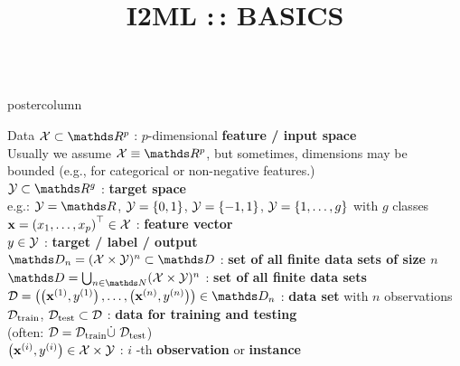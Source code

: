\documentclass{beamer}
\title{I2ML :\,: BASICS} %
\newlength{\columnheight} %
\begin{document}
\begin{frame}[fragile]{}
\vspace{-8ex}
\begin{columns}
	\begin{column}{.31\textwidth}
		\begin{beamercolorbox}[center]{postercolumn}
			\begin{minipage}{.98\textwidth}
				\parbox[t][\columnheight]{\textwidth}{
\begin{myblock}{Data}
 $\Xspace \subset \R^p$ : $p$-dimensional \textbf{feature / input space}\\ 
Usually we assume $\Xspace \equiv \R^p$, but sometimes, dimensions may be \\  
bounded (e.g., for categorical or non-negative features.)    \\

$\Yspace \subset \R^g$ : \textbf{target space} \\ 
e.g.: $\Yspace = \R$, $\mathcal{Y} = \lbrace 0, 1 \rbrace$, $\mathcal{Y} = \lbrace -1, 1 \rbrace$, $\mathcal{Y} = \{1, \ldots, g\}$ with $g$ classes\\

$\mathbf{x} = \left(x_1, \ldots, x_p\right)^\top \in \mathcal{X}$ : \textbf{feature vector} \\ 
 
$y \in \mathcal{Y}$ : \textbf{target / label / output} \\
 
$\allDatasetsn = \defAllDatasetsn \subset \allDatasets$ : \textbf{set of all finite data sets of size $n$} \\

$\allDatasets = \defAllDatasets$ : \textbf{set of all finite data sets} \\
 
$\D = \Dset \in \allDatasetsn $ : \textbf{data set} with $n$ observations \\
 
$\mathcal{D}_{\text{train}}$, $\mathcal{D}_{\text{test}} \subset \mathcal{D}$ : \textbf{data for training and testing} \\ 
(often: $\mathcal{D} = \mathcal{D}_{\text{train}} \dot{\cup} ~ \mathcal{D}_{\text{test}}$)\\
 
$\left(\mathbf{x}^{(i)}, y^{(i)}\right) \in \mathcal{X}\times \mathcal{Y}$ : $i$ -th \textbf{observation} or \textbf{instance} \\
 

\end{myblock}}
\end{minipage}
\end{beamercolorbox}
\end{column}
\end{columns}
\end{frame}
\end{document}

